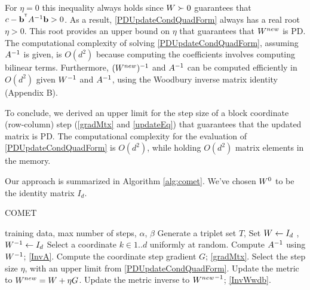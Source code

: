 \documentclass{article}
\begin{document}


For $\eta = 0$ this inequality always
holds since ${W} \succ 0$ guarantees that $c-\mathbf{b}^{{}^\mathsf{T}} A^{-1} \mathbf{b} >0$. As a result,
 \eqref{PDUpdateCondQuadForm} always has a real
root $\eta > 0$. This root provides an upper bound on $\eta$ that guarantees that ${{W^{new}}}$ is PD. The computational complexity of solving \eqref{PDUpdateCondQuadForm}, assuming $A^{-1}$ is given, is $O(d^2)$ because computing the coefficients involves computing bilinear terms.
Furthermore, $({{W^{new}}})^{-1}$ and $A^{-1}$ can be computed efficiently in $O(d^2)$ given ${W}^{-1}$ and $A^{-1}$, using the Woodbury inverse matrix identity (Appendix B).

To conclude, we derived an upper limit for the step size of a block coordinate (row-column) step (\eqref{gradMtx} and \eqref{updateEq}) that guarantees that the updated matrix is PD. The computational complexity for the evaluation
of \eqref{PDUpdateCondQuadForm} is $O(d^2)$, while holding $O(d^2)$ matrix elements in the memory.
Our approach is summarized in Algorithm \ref{alg:comet}. We've chosen ${W}^0$ to be the identity matrix $I_d$.

\begin{algorithm}[tb]
   \caption{COMET}
   \label{alg:comet}
\begin{algorithmic}[1]
    training data, max number of steps, $\alpha$, $\beta$
   \STATE Generate a triplet set $T$, Set  ${W}  \leftarrow I_d$ , ${W}^{-1}  \leftarrow I_d$
   \REPEAT 
   \STATE Select a coordinate $k \in {1..d}$ uniformly at random.
   \STATE Compute $A^{-1}$ using ${W}^{-1}$; \eqref{InvA}.
   \STATE Compute the coordinate step gradient $G$; \eqref{gradMtx}.
   \STATE Select the step size $\eta$, with an upper limit from \eqref{PDUpdateCondQuadForm}.
   \STATE Update the metric to ${{W^{new}}}={W}+\eta G$.
   \STATE Update the metric inverse to ${{W^{new}}}^{-1}$; \eqref{InvWwdb}.
\end{algorithmic}
\end{algorithm}
\end{document}
